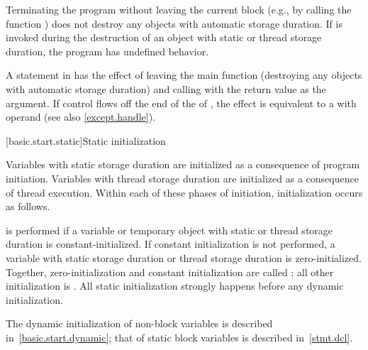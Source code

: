 \pnum
{}%
%
%
Terminating the program
without leaving the current block (e.g., by calling the function
) does not destroy any
objects with automatic storage duration. If
 is invoked during the destruction of
an object with static or thread storage duration, the program has undefined
behavior.

\pnum
{}%
%
A  statement in  has the effect of leaving the main
function (destroying any objects with automatic storage duration) and
calling  with the return value as the argument.
If control flows off the end of
the  of ,
the effect is equivalent to a  with operand 
(see also \ref{except.handle}).

[basic.start.static]{Static initialization}

\pnum
{}%
%
Variables with static storage duration
are initialized as a consequence of program initiation. Variables with
thread storage duration are initialized as a consequence of thread execution.
Within each of these phases of initiation, initialization occurs as follows.

\pnum
{}%
 is performed
if a variable or temporary object with static or thread storage duration
is constant-initialized.
%
If constant initialization is not performed, a variable with static
storage duration or thread storage
duration is zero-initialized.
Together, zero-initialization and constant initialization are called
;
all other initialization is .
All static initialization strongly happens before
any dynamic initialization.
\begin{note}
The dynamic initialization of non-block variables is described
in~\ref{basic.start.dynamic}; that of static block variables is described
in~\ref{stmt.dcl}.
\end{note}

